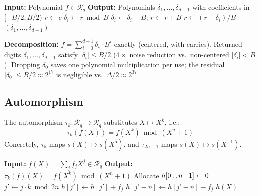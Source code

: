 \documentclass[11pt,a4paper]{article}
\newcommand{\R}{\mathcal{R}}
\newcommand{\Rq}{\R_{q}}
\begin{document}
\begin{algorithm}[H]
\caption{$\textsc{Decomp}(f)$: Approximate centered gadget decomposition.}
\label{alg:gadget}
\begin{algorithmic}[1]
\State \textbf{Input:} Polynomial $f \in \Rq$
\State \textbf{Output:} Polynomials $\delta_1, \ldots, \delta_{d-1}$ with coefficients in $[-B/2, B/2)$
 
    \State $r \gets c$
        \State $\delta_i \gets r \bmod B$ \Comment{remainder in $[0, B)$}
         $\delta_i \gets \delta_i - B$; \quad $r \gets r + B$ \EndIf \Comment{center to $[-B/2, B/2)$}
        \State $r \gets (r - \delta_i) / B$ 
    \EndFor
\EndFor
\State \Return $(\delta_1, \ldots, \delta_{d-1})$ 
\end{algorithmic}
\end{algorithm}

\textbf{Decomposition:} $f = \sum_{i=0}^{d-1} \delta_i \cdot B^i$ exactly (centered, with carries).
Returned digits $\delta_1, \ldots, \delta_{d-1}$ satisfy $|\delta_i| \le B/2$ ($4\times$ noise reduction vs.\ non-centered $|\delta_i| < B$).
Dropping $\delta_0$ saves one polynomial multiplication per use; the residual $|\delta_0| \le B/2 \approx 2^{17}$ is negligible vs.\ $\Delta/2 \approx 2^{37}$.

\subsection{Automorphism}\label{sec:auto}

The automorphism $\tau_k: \Rq \to \Rq$ substitutes $X \mapsto X^k$, i.e.:
\[
    \tau_k(f(X)) = f(X^k) \bmod (X^n + 1)
\]
Concretely, $\tau_5$ maps $s(X) \mapsto s(X^5)$, and $\tau_{2n-1}$ maps $s(X) \mapsto s(X^{-1})$.

\begin{algorithm}[H]
\caption{$\tau_k(f(X))$: Apply automorphism ($k$ odd, $\gcd(k, 2n) = 1$).}
\label{alg:automorphism}
\begin{algorithmic}[1]
\State \textbf{Input:} $f(X) = \sum_j f_j X^j \in \Rq$
\State \textbf{Output:} $\tau_k(f)(X) = f(X^k) \bmod (X^n+1)$
\State Allocate $h[0 \mathinner{.\,.} n\!-\!1] \gets 0$
    \State $j' \gets j \cdot k \bmod 2n$
     $h[j'] \gets h[j'] + f_j$
    \Else{} $h[j' - n] \gets h[j' - n] - f_j$ 
    \EndIf
\EndFor
\State \Return $h(X)$
\end{algorithmic}
\end{algorithm}
\end{document}
